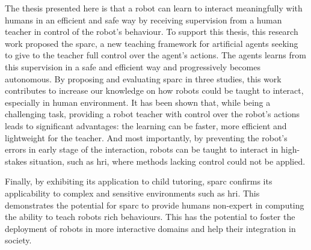 The thesis presented here is that a robot can learn to interact meaningfully with humans in an efficient and safe way by receiving supervision from a human teacher in control of the robot's behaviour. 
%
%
To support this thesis, this research work proposed the \acrfull{sparc}, a new teaching framework for artificial agents seeking to give to the teacher full control over the agent's actions. The agents learns from this supervision in a safe and efficient way and progressively becomes autonomous. By proposing and evaluating \gls{sparc} in three studies, this work contributes to increase our knowledge on how robots could be taught to interact, especially in human environment. It has been shown that, while being a challenging task, providing a robot teacher with control over the robot's actions leads to significant advantages: the learning can be faster, more efficient and lightweight for the teacher. And most importantly, by preventing the robot's errors in early stage of the interaction, robots can be taught to interact in high-stakes situation, such as \gls{hri}, where methods lacking control could not be applied.

Finally, by exhibiting its application to child tutoring, \gls{sparc} confirms its applicability to complex and sensitive environments such as \gls{hri}. This demonstrates the potential for \gls{sparc} to provide humans non-expert in computing the ability to teach robots rich behaviours. This has the potential to foster the deployment of robots in more interactive domains and help their integration in society.